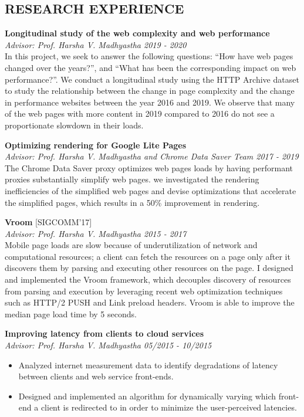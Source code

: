 \documentclass[zhemargin]{res}
\begin{document}
\begin{resume}
\section{\small RESEARCH EXPERIENCE}
  \textbf{Longitudinal study of the web complexity and web performance}\\
    \textit{Advisor: Prof. Harsha V. Madhyastha \hfill 2019 - 2020}\\
    In this project, we seek to answer the following questions: ``How have
      web pages changed over the years?'', and ``What has been the corresponding
      impact on web performance?''. We conduct a longitudinal study using the
      HTTP Archive dataset to study the relationship between the change in page
      complexity and the change in performance websites between the year 2016
      and 2019. We observe that many of the web pages with more content in 2019
      compared to 2016 do not see a proportionate slowdown in their loads.

  \textbf{Optimizing rendering for Google Lite Pages}\\
    \textit{Advisor: Prof. Harsha V. Madhyastha and Chrome Data Saver Team\hfill
    2017 - 2019}\\
    The Chrome Data Saver proxy optimizes web pages loads by having performant
    proxies substantially simplify web pages. we investigated the rendering
    inefficiencies of the simplified web pages and devise optimizations that
    accelerate the simplified pages, which results in a 50\% improvement in
    rendering.


  \textbf{Vroom} [SIGCOMM'17]\\
    \textit{Advisor: Prof. Harsha V. Madhyastha \hfill 2015 - 2017}\\
    Mobile page loads are slow because of underutilization of network and
    computational resources; a client can fetch the resources on a page only
    after it discovers them by parsing and executing other resources on the
    page.  I designed and implemented the Vroom framework, which decouples
    discovery of resources from parsing and execution by leveraging recent web
    optimization techniques such as HTTP/2 PUSH and Link preload headers. Vroom
    is able to improve the median page load time by 5 seconds.

	\textbf{Improving latency from clients to cloud services}\\
    \textit{Advisor: Prof. Harsha V. Madhyastha \hfill 05/2015 - 10/2015}\\
	\begin{itemize}
    \item Analyzed internet measurement data to identify degradations of
      latency between clients and web service front-ends.
    \item Designed and implemented an algorithm for dynamically varying
      which front-end a client is redirected to in order to minimize the
      user-perceived latencies.
	\end{itemize}


\end{resume}
\end{document}
